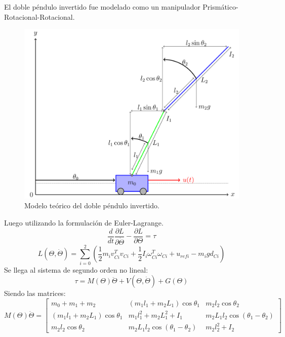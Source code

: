 %
%

El doble péndulo invertido fue modelado como un manipulador Prismático-Rotacional-Rotacional. 
\begin{figure}[H]
	\centering
	\includegraphics[width=\linewidth]{../Modelo Teorico/ImagenesModelo Teorico/sistema}
	\caption{Modelo teórico del doble péndulo invertido.}	
	\label{fig:pendteo}
\end{figure}
Luego utilizando la formulación de Euler-Lagrange.
\begin{equation}
  \frac{d}{dt}\frac{\partial L}{\partial \dot{\Theta}} - \frac{\partial L}{\partial \Theta}  = \tau
\end{equation} 
\begin{equation}
L\left( \Theta , \dot{\Theta} \right) = \sum_{i=0}^2
\left( \frac{1}{2} m_i v_{Ci}^Tv_{Ci} +\frac{1}{2} I_i \omega_{Ci}^T\omega_{Ci} + u_{refi} - m_i g d_{Ci}\right)
\end{equation} 
Se llega al sistema de segundo orden no lineal:
\begin{equation}
\tau = M\left( \Theta \right)\ddot{\Theta} + V\left( \Theta , \dot{\Theta} \right) + G\left( \Theta \right)
\end{equation}
Siendo las matrices:
\begin{equation}
 M\left( \Theta \right)\ddot{\Theta} = \begin{bmatrix}
m_0+m_1+m_2 & \left( m_1l_1 + m_2L_1 \right) \cos \theta_1 & m_2l_2 \cos \theta_2\\

\left( m_1l_1 + m_2L_1 \right) \cos \theta_1  &
m_1l_1^2+m_2L_1^2+I_1
& m_2L_1l_2\cos(\theta_1-\theta_2)\\


m_2l_2\cos\theta_2 & m_2L_1l_2\cos(\theta_1-\theta_2) & m_2l_2^2+I_2
\end{bmatrix}
\end{equation}
